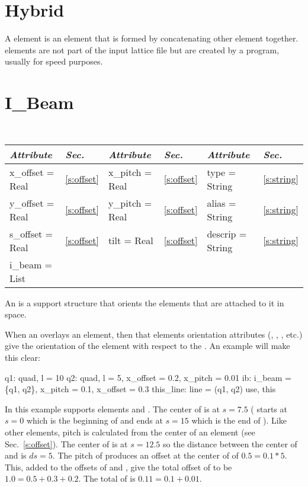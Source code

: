 \section{Hybrid}
\label{s:hybrid}

A  element is an element that is formed by concatenating
other element together.  elements are not part of the input
lattice file but are created by a program, usually for speed purposes.

\section{I\_Beam}
\label{s:i_beam}

\begin{center}
\tt
\begin{tabular}{|l|l||l|l||l|l|} \hline
  {\sl Attribute} & {\sl Sec.}  & {\sl Attribute} & {\sl Sec.} & {\sl Attribute} & {\sl Sec.} \\ \hline
  x\_offset  = Real     & \ref{s:offset}  &   x\_pitch  = Real     & \ref{s:offset}  &  type = String    & \ref{s:string}  \\ \hline
  y\_offset  = Real     & \ref{s:offset}  &   y\_pitch  = Real     & \ref{s:offset}  &  alias = String   & \ref{s:string}  \\ \hline
  s\_offset  = Real     & \ref{s:offset}  &   tilt      = Real     & \ref{s:offset}  &  descrip = String & \ref{s:string}  \\ \hline
  i\_beam = List        &                 &                        &                 &                   &                 \\ \hline
\end{tabular}
\end{center}
\toffset

An  is a support structure that orients the elements that
are attached to it in space.

When an  overlays an element, then that elements
orientation attributes (, , , etc.) 
give the orientation of
the element with respect to the . An example will make this clear:
\begin{example}
  q1: quad, l = 10
  q2: quad, l = 5, x_offset = 0.2, x_pitch = 0.01
  ib: i_beam = \{q1, q2\}, x_pitch = 0.1, x_offset = 0.3
  this_line: line = (q1, q2)
  use, this
\end{example}
In this example  supports elements  and . The
center of  is at $s = 7.5$ ( starts at $s = 0$ which is
the beginning of  and ends at $s = 15$ which is the end of
). Like other elements, pitch is calculated from the center of
an  element (see Sec.~\ref{s:offset}). The center of
 is at $s = 12.5$ so the distance between the center of 
and  is $ds = 5$. The pitch of  produces an offset at
the center of  of $0.5 = 0.1 * 5$. This, added to the offsets
of  and , give the total offset of  to be $1.0 =
0.5 + 0.3 + 0.2$. The total  of  is $0.11 = 0.1 +
0.01$.

